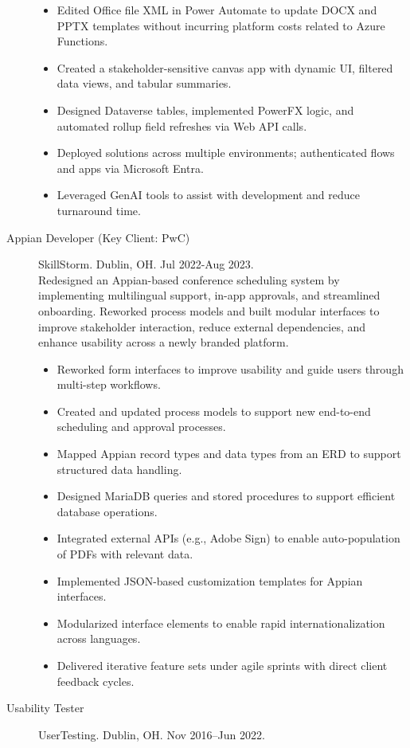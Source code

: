 \documentclass{article}
\begin{document}
\begin{description}
\begin{itemize}
    \item Edited Office file XML in Power Automate to update DOCX and PPTX templates without incurring platform costs related to Azure Functions.
    \item Created a stakeholder-sensitive canvas app with dynamic UI, filtered data views, and tabular summaries.
    \item Designed Dataverse tables, implemented PowerFX logic, and automated rollup field refreshes via Web API calls.
    \item Deployed solutions across multiple environments; authenticated flows and apps via Microsoft Entra.
    \item Leveraged GenAI tools to assist with development and reduce turnaround time.
  \end{itemize}
  \item[Appian Developer (Key Client: PwC)] SkillStorm. Dublin, OH. Jul 2022-Aug 2023. \\
  Redesigned an Appian-based conference scheduling system by implementing multilingual support, in-app approvals, and streamlined onboarding. Reworked process models and built modular interfaces to improve stakeholder interaction, reduce external dependencies, and enhance usability across a newly branded platform.
  \begin{itemize}
    \item Reworked form interfaces to improve usability and guide users through multi-step workflows.
    \item Created and updated process models to support new end-to-end scheduling and approval processes.
    \item Mapped Appian record types and data types from an ERD to support structured data handling.
    \item Designed MariaDB queries and stored procedures to support efficient database operations.
    \item Integrated external APIs (e.g., Adobe Sign) to enable auto-population of PDFs with relevant data.
    \item Implemented JSON-based customization templates for Appian interfaces.
    \item Modularized interface elements to enable rapid internationalization across languages.
    \item Delivered iterative feature sets under agile sprints with direct client feedback cycles.
  \end{itemize}
  \pagebreak
\item[Usability Tester] UserTesting. Dublin, OH. Nov 2016–Jun 2022.

\end{description}
\end{document}
